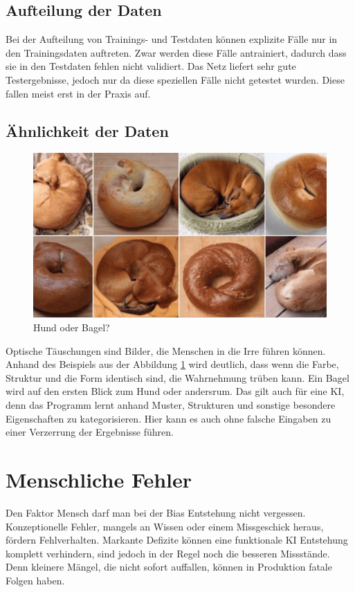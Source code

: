 \documentclass[12pt,oneside,a4paper,parskip]{scrbook}
\begin{document}
\subsection{Aufteilung der Daten}
\label{section:AufteilungDerDaten}
Bei der Aufteilung von Trainings- und Testdaten können explizite Fälle nur in den Trainingsdaten auftreten. Zwar werden diese Fälle antrainiert, dadurch dass sie in den Testdaten fehlen nicht validiert. Das Netz liefert sehr gute Testergebnisse, jedoch nur da diese speziellen Fälle nicht getestet wurden. Diese fallen meist erst in der Praxis auf.
\subsection{Ähnlichkeit der Daten}
\label{section:similarData}
\begin{figure}[h]
	\begin{center}
		\includegraphics[width=15cm]{Bilder/dog_or_bagel.jpg}
		\caption{Hund oder Bagel?}
		\label{fig:dogBagel}
	\end{center}
\end{figure}

Optische Täuschungen sind Bilder, die Menschen in die Irre führen können. 
Anhand des Beispiels aus der Abbildung \ref{fig:dogBagel} wird deutlich,
dass wenn die Farbe, Struktur und die Form identisch sind,
die Wahrnehmung trüben kann. Ein Bagel wird auf den ersten Blick zum Hund oder andersrum. 
Das gilt auch für eine KI, denn das Programm lernt anhand Muster, Strukturen und sonstige besondere Eigenschaften zu kategorisieren. Hier kann es auch ohne falsche Eingaben zu einer Verzerrung der Ergebnisse führen.

\section{Menschliche Fehler}
\label{section:humanFehler}
Den Faktor Mensch darf man bei der Bias Entstehung nicht vergessen. Konzeptionelle Fehler, mangels an Wissen oder einem Missgeschick heraus, fördern Fehlverhalten. Markante Defizite können eine funktionale KI Entstehung komplett verhindern, sind jedoch in der Regel noch die besseren Missstände. Denn kleinere Mängel, die nicht sofort auffallen, können in Produktion fatale Folgen haben. %
\end{document}
